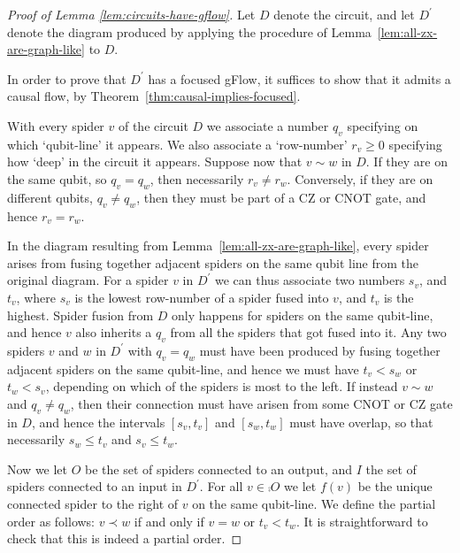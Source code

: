 \documentclass[a4paper,onecolumn,superscriptaddress,11pt,accepted=2020-04-27]{quantumarticle}
\theoremstyle{definition}
\begin{document}
\begin{proof}[Proof of Lemma \ref{lem:circuits-have-gflow}]
  Let $D$ denote the circuit, and let $D^\prime$ denote the diagram produced 
  by applying the procedure of Lemma~\ref{lem:all-zx-are-graph-like} to $D$.
  
  In order to prove that $D^\prime$ has a focused gFlow, it suffices to show that it admits a causal flow, by Theorem~\ref{thm:causal-implies-focused}.

  With every spider $v$ of the circuit $D$ we associate a number $q_v$ specifying on which `qubit-line' it appears.
  We also associate a `row-number' $r_v\geq 0$ specifying how `deep' in the circuit it appears.
  Suppose now that $v\sim w$ in $D$. If they are on the same qubit, so $q_v=q_w$, then necessarily $r_v\neq r_w$.
  Conversely, if they are on different qubits, $q_v\neq q_w$, then they must be part of a CZ or CNOT gate,
  and hence $r_v=r_w$.

  In the diagram resulting from Lemma~\ref{lem:all-zx-are-graph-like}, every spider arises from fusing together adjacent spiders on the same qubit line from the original diagram.
  For a spider $v$ in $D^\prime$ we can thus associate two numbers $s_v$, and $t_v$, 
  where $s_v$ is the lowest row-number of a spider fused into $v$, and $t_v$ is the highest.
  Spider fusion from $D$ only happens for spiders on the same qubit-line, and hence $v$ also inherits a $q_v$ from
  all the spiders that got fused into it. Any two spiders $v$ and $w$ in $D^\prime$ with $q_v=q_w$
  must have been produced by fusing together adjacent spiders on the same qubit-line,
  and hence we must have $t_v<s_w$ or $t_w<s_v$, depending on which of the spiders is most to the left.
  If instead $v\sim w$ and $q_v\neq q_w$, then their connection must have arisen from some CNOT or CZ gate in $D$, 
  and hence the intervals $[s_v,t_v]$ and $[s_w,t_w]$ must have overlap,
  so that necessarily $s_w\leq t_v$ and $s_v\leq t_w$.


  Now we let $O$ be the set of spiders connected to an output, 
  and $I$ the set of spiders connected to an input in $D^\prime$.
  For all $v\in \comp O$ we let $f(v)$ be the unique connected spider to the right of $v$ on the same qubit-line.
  We define the partial order as follows: $v\prec w$ if and only if $v=w$ or $t_v<t_w$. 
  It is straightforward to check that this is indeed a partial order.


\end{proof}
\end{document}
